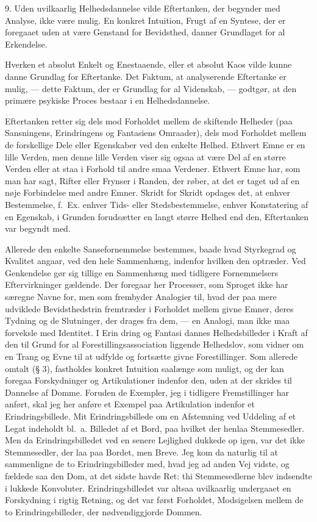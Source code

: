 \documentclass[12pt]{article}
\newcommand{\opage}[1]{\marginnote{\footnotesize\textit{[#1]}}}
\begin{document}
9. Uden uvilkaarlig Helhedsdannelse vilde Eftertanken, der begynder med
Analyse, ikke være mulig. En konkret Intuition, Frugt af en Syntese, der er
foregaaet uden at være Genstand for Bevidsthed, danner Grundlaget for al Erkendelse.

Hverken et absolut Enkelt og Enestaaende, eller et absolut Kaos vilde kunne
danne Grundlag for Eftertanke. Det Faktum, at analyserende Eftertanke er mulig,
--- dette Faktum, der er Grundlag for al Videnskab, --- godtgør, at den primære
psykiske Proces bestaar i en Helhedsdannelse.

Eftertanken retter sig dels mod Forholdet mellem de skiftende Helheder (paa
Sansningens, Erindringens og Fantasiens Omraader), dels mod Forholdet mellem
de forskellige Dele eller Egenskaber ved den enkelte Helhed. Ethvert Emne er en
lille Verden, men denne lille Verden viser sig ogsaa at være Del af en større
Verden eller at staa i Forhold til andre smaa Verdener. Ethvert Emne har, som
man har sagt, Rifter eller Frynser i Randen, der røber, at det er taget ud af en
nøje Forbindelse med andre Emner. Skridt for Skridt opdages det, at enhver
Bestemmelse, f.~Ex. enhver Tids- eller Stedsbestemmelse, enhver Konstatering af en
Egenskab, i Grunden forudsætter en langt større Helhed end den, Eftertanken var
begyndt med.

Allerede den enkelte Sansefornemmelse bestemmes, baade hvad Styrkegrad og
Kvalitet angaar, ved den hele Sammenhæng, indenfor hvilken den optræder. Ved
Genkendelse gør sig tillige en Sammenhæng med tidligere Fornemmelsers
Eftervirkninger gældende. Der foregaar her Processer, som Sproget ikke har særegne Navne
for, men som frembyder Analogier til, hvad der paa mere udviklede
Bevidsthedstrin fremtræder i Forholdet mellem givne Emner, deres Tydning og de Slutninger,
der drages fra dem, --- en Analogi, man ikke maa forveksle med Identitet. I Erin%
\setcounter{footnote}{0}%
\opage{24}dring og Fantasi dannes Helhedsbilleder i Kraft af den til Grund for al
Forestillingsassociation liggende Helhedslov, som vidner om en Trang og Evne til at
udfylde og fortsætte givne Forestillinger. Som allerede omtalt (§ 3), fastholdes
konkret Intuition saalænge som muligt, og der kan foregaa Forskydninger og
Artikulationer indenfor den, uden at der skrides til Dannelse af Domme. Foruden de
Exempler, jeg i tidligere Fremstillinger har anført, skal jeg her anføre et Exempel
paa Artikulation indenfor et Erindringsbillede. Mit Erindringsbillede om en
Afstemning ved Uddeling af et Legat indeholdt bl.~a. Billedet af et Bord, paa hvilket
der henlaa Stemmesedler. Men da Erindringsbilledet ved en senere Lejlighed
dukkede op igen, var det ikke Stemmesedler, der laa paa Bordet, men Breve.
Jeg kom da naturlig til at sammenligne de to Erindringsbilleder med, hvad jeg
ad anden Vej vidste, og fældede saa den Dom, at det sidste havde Ret: thi
Stemmesedlerne blev indsendte i lukkede Konvoluter. Erindringsbilledet var
altsaa uvilkaarlig undergaaet en Forskydning i rigtig Retning, og det var først
Forholdet, Modsigelsen mellem de to Erindringsbilleder, der nødvendiggjorde
Dommen.
\end{document}
